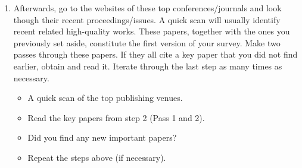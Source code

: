 \documentclass[a4paper]{article}
\begin{document}
\begin{enumerate}
\item Afterwards, go to the websites of these top conferences/journals and look though their recent proceedings/issues. A quick scan will usually identify recent related high-quality works. These papers, together with the ones you previously set aside, constitute the first version of your survey. Make two passes through these papers. If they all cite a key paper that you did not find earlier, obtain and read it. Iterate through the last step as many times as necessary.
\renewcommand{\labelitemi}{$\square$}
    \begin{itemize}
        \item A quick scan of the top publishing venues.
  	    \item Read the key papers from step 2 (Pass 1 and 2).
  	    \item Did you find any new important papers?
  	    \item Repeat the steps above (if necessary).
    \end{itemize}
\end{enumerate}
\end{document}
